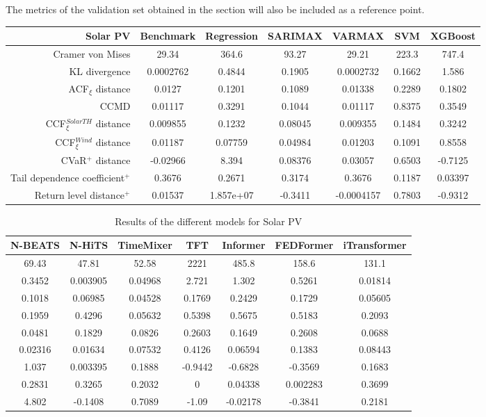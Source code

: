 The metrics of the validation set obtained in the  section will also be included as a reference point. 
\newpage
\begin{table}[ht]
    \footnotesize
    \begin{tabular}[l]{r|c|ccc|cc|}
        \toprule
        \textbf{Solar PV} &Benchmark&Regression&SARIMAX&VARMAX&SVM&XGBoost \\ 
        \midrule            
        Cramer von Mises&29.34&364.6&93.27&29.21&223.3&747.4 \\
        KL divergence&0.0002762&0.4844&0.1905&0.0002732&0.1662&1.586 \\
        ACF$_\xi$ distance&0.0127&0.1201&0.1089&0.01338&0.2289&0.1802 \\
        \midrule
        CCMD&0.01117&0.3291&0.1044&0.01117&0.8375&0.3549 \\
        CCF$_\xi^{Solar TH}$ distance&0.009855&0.1232&0.08045&0.009355&0.1484&0.3242 \\
        CCF$_\xi^{Wind}$ distance&0.01187&0.07759&0.04984&0.01203&0.1091&0.8558 \\
        \midrule
        CVaR$^+$ distance&-0.02966&8.394&0.08376&0.03057&0.6503&-0.7125 \\
        Tail dependence coefficient$^+$&0.3676&0.2671&0.3174&0.3676&0.1187&0.03397 \\
        Return level distance$^+$&0.01537&1.857e+07&-0.3411&-0.0004157&0.7803&-0.9312 \\
        \bottomrule
    \end{tabular}
\end{table}
\begin{table}[ht]
    \footnotesize
    \begin{flushright}
    \begin{tabular}[r]{|ccc|cccc}
        \toprule
        N-BEATS&N-HiTS&TimeMixer&TFT&Informer&FEDFormer&iTransformer  \\
        \midrule            
        69.43&47.81&52.58&2221&485.8&158.6&131.1 \\
        0.3452&0.003905&0.04968&2.721&1.302&0.5261&0.01814 \\
        0.1018&0.06985&0.04528&0.1769&0.2429&0.1729&0.05605 \\
        \midrule
        0.1959&0.4296&0.05632&0.5398&0.5675&0.5183&0.2093 \\
        0.0481&0.1829&0.0826&0.2603&0.1649&0.2608&0.0688 \\
        0.02316&0.01634&0.07532&0.4126&0.06594&0.1383&0.08443 \\
        \midrule
        1.037&0.003395&0.1888&-0.9442&-0.6828&-0.3569&0.1683 \\
        0.2831&0.3265&0.2032&0&0.04338&0.002283&0.3699 \\
        4.802&-0.1408&0.7089&-1.09&-0.02178&-0.3841&0.2181 \\
        \bottomrule
    \end{tabular}
    \end{flushright}
    \caption{Results of the different models for Solar PV\label{long}}
    \label{table:results-solar-pv}
\end{table}

